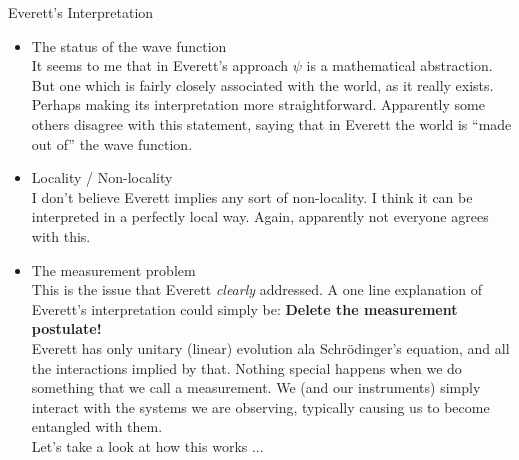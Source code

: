 \documentclass[9pt,usenames,dvipsnames]{beamer}
\begin{document}
\begin{frame}[t]{Everett's Interpretation}
\begin{itemize}
\item The status of the wave function
  \vspace{6pt}\\
  It seems to me that in Everett's approach $\psi$ is a mathematical
  abstraction. But one which is fairly closely associated with the world,
  as it really exists. Perhaps making its interpretation more straightforward.
  Apparently some others disagree with this statement, saying that in
  Everett the world is ``made out of'' the wave function. 
\vspace{6pt}\\
\item Locality / Non-locality
  \vspace{6pt}\\
  I don't believe Everett implies any sort of non-locality. I think
  it can be interpreted in a perfectly local way. Again, apparently
  not everyone agrees with this.
\vspace{6pt}\\
\item The measurement problem
  \vspace{6pt}\\
  This is the issue that Everett {\it clearly} addressed. A one line
  explanation of Everett's interpretation could simply be:
  {\bf Delete the measurement postulate!}
  \vspace{6pt}\\
  Everett has only unitary (linear) evolution ala Schr\"odinger's equation, 
  and all the interactions implied by that. Nothing special happens when we do
  something that we call a measurement. We (and our instruments) simply
  interact with the systems we are observing, typically causing us to become
  entangled with them.
  \vspace{6pt}\\
  Let's take a look at how this works ...
\end{itemize}
\end{frame}
\end{document}
